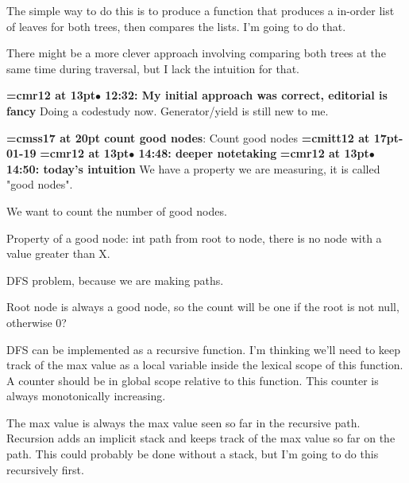 The simple way to do this is to produce a function that produces a in-order list of leaves for both trees, then compares the lists. I'm going to do that.
\par

There might be a more clever approach involving comparing both trees at the same time during traversal, but I lack the intuition for that.
\par

{\smallskip\noindent\bf\font\titlefont=cmr12 at 13pt\titlefont $\bullet$ 12:32: My initial approach was correct, editorial is fancy}\smallskip
Doing a codestudy now. Generator/yield is still new to me.
\par

{\medskip\noindent\bf\font\titlefont=cmss17 at 20pt count good nodes}: Count good nodes
{\medskip\noindent\bf\font\titlefont=cmitt12 at 17pt-01-19}\medskip
{\smallskip\noindent\bf\font\titlefont=cmr12 at 13pt\titlefont $\bullet$ 14:48: deeper notetaking}\smallskip
{\smallskip\noindent\bf\font\titlefont=cmr12 at 13pt\titlefont $\bullet$ 14:50: today's intuition}\smallskip
We have a property we are measuring, it is called "good nodes".
\par

We want to count the number of good nodes.
\par

Property of a good node: int path from root to node, there is no node with a value greater than X.
\par

DFS problem, because we are making paths.
\par

Root node is always a good node, so the count will be one if the root is not null, otherwise 0?
\par

DFS can be implemented as a recursive function. I'm thinking we'll need to keep track of the max value as a local variable inside the lexical scope of this function. A counter should be in global scope relative to this function. This counter is always monotonically increasing.
\par

The max value is always the max value seen so far in the recursive path. Recursion adds an implicit stack and keeps track of the max value so far on the path. This could probably be done without a stack, but I'm going to do this recursively first.
\par

